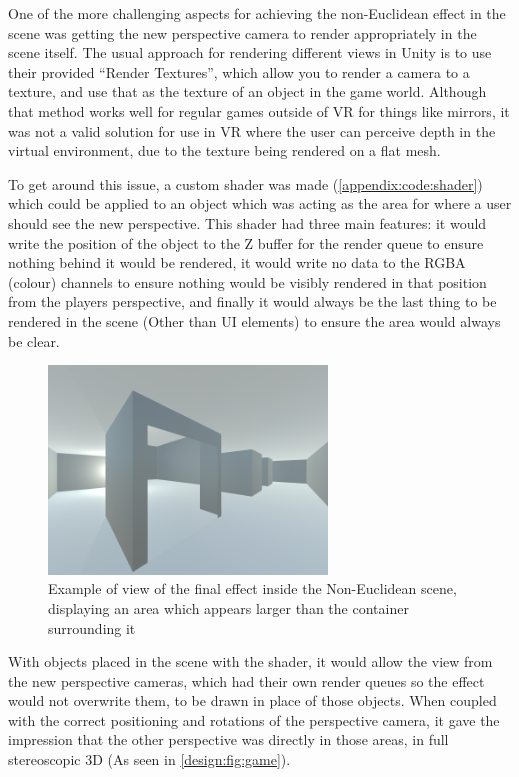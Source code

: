 		One of the more challenging aspects for achieving the non-Euclidean effect in the scene was getting the new perspective camera to render appropriately in the scene itself.
		The usual approach for rendering different views in Unity is to use their provided \enquote{Render Textures}, which allow you to render a camera to a texture, and use that as the texture of an object in the game world.
		Although that method works well for regular games outside of VR for things like mirrors, it was not a valid solution for use in VR where the user can perceive depth in the virtual environment, due to the texture being rendered on a flat mesh.

		To get around this issue, a custom shader was made (\autoref{appendix:code:shader}) which could be applied to an object which was acting as the area for where a user should see the new perspective.
		This shader had three main features: it would write the position of the object to the Z buffer for the render queue to ensure nothing behind it would be rendered, it would write no data to the RGBA (colour) channels to ensure nothing would be visibly rendered in that position from the players perspective, and finally it would always be the last thing to be rendered in the scene (Other than UI elements) to ensure the area would always be clear.

		\begin{figure}[h]
			\includegraphics[width=0.66\textwidth]{Images/NE_View}
			\centering
			\caption{Example of view of the final effect inside the Non-Euclidean scene, displaying an area which appears larger than the container surrounding it}
			\label{design:fig:game}
		\end{figure}

		With objects placed in the scene with the shader, it would allow the view from the new perspective cameras, which had their own render queues so the effect would not overwrite them, to be drawn in place of those objects.
		When coupled with the correct positioning and rotations of the perspective camera, it gave the impression that the other perspective was directly in those areas, in full stereoscopic 3D (As seen in \autoref{design:fig:game}).

